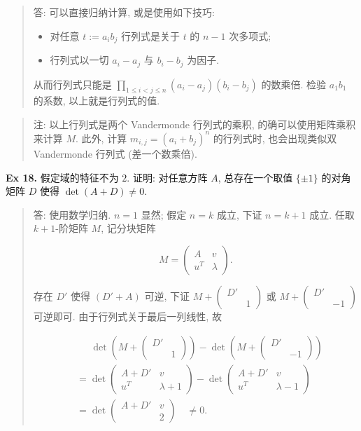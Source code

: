 \documentclass[
]{ctexart}
\begin{document}
\begin{quote}
答: 可以直接归纳计算, 或是使用如下技巧:

\begin{itemize}
\item
  对任意 \(t:=a_ib_j\) 行列式是关于 \(t\) 的 \(n-1\) 次多项式;
\item
  行列式以一切 \(a_i-a_j\) 与 \(b_i-b_j\) 为因子.
\end{itemize}

从而行列式只能是 \(\prod_{1\leq i<j\leq n}(a_i-a_j)(b_i-b_j)\) 的数乘倍.
检验 \(a_1b_1\) 的系数, 以上就是行列式的值.
\end{quote}

\begin{quote}
注: 以上行列式是两个 Vandermonde 行列式的乘积,
的确可以使用矩阵乘积来计算 \(M\). 此外, 计算 \(m_{i,j}=(a_i+b_j)^n\)
的行列式时, 也会出现类似双 Vandermonde 行列式 (差一个数乘倍).
\end{quote}

\textbf{Ex 18.} 假定域的特征不为 \(2\). 证明: 对任意方阵 \(A\),
总存在一个取值 \(\{\pm 1\}\) 的对角矩阵 \(D\) 使得 \(\det (A+D)\neq 0\).

\begin{quote}
答: 使用数学归纳. \(n=1\) 显然; 假定 \(n=k\) 成立, 下证 \(n=k+1\) 成立.
任取 \(k+1\)-阶矩阵 \(M\), 记分块矩阵

\[M=\begin{pmatrix}A&v\\ u^T&\lambda\end{pmatrix}.\]

存在 \(D'\) 使得 \((D'+A)\) 可逆, 下证
\(M+\begin{pmatrix}D'&\\&1\end{pmatrix}\) 或
\(M+\begin{pmatrix}D'&\\&-1\end{pmatrix}\) 可逆即可.
由于行列式关于最后一列线性, 故

\begin{align}
&\quad \ \ \det \left(M+\begin{pmatrix}D'&\\&1\end{pmatrix}\right)-\det \left(M+\begin{pmatrix}D'&\\&-1\end{pmatrix}\right)\\[6pt]
&=\det \begin{pmatrix}A+D'&v\\ u^T&\lambda+1\end{pmatrix}-\det \begin{pmatrix}A+D'&v\\ u^T&\lambda-1\end{pmatrix}\\[6pt]
&=\det \begin{pmatrix}A+D'&v\\ &2\end{pmatrix}\quad \neq 0.
\end{align}
\end{quote}
\end{document}
